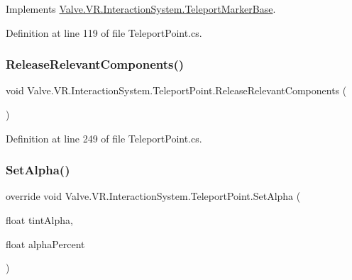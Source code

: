 Implements \mbox{\hyperlink{class_valve_1_1_v_r_1_1_interaction_system_1_1_teleport_marker_base_ab2505033275992613453b17981dd4053}{Valve.\+V\+R.\+Interaction\+System.\+Teleport\+Marker\+Base}}.



Definition at line 119 of file Teleport\+Point.\+cs.

\mbox{\label{class_valve_1_1_v_r_1_1_interaction_system_1_1_teleport_point_a018ebad25bd2d5b4196af3e490dfe868}} 
\subsubsection{\texorpdfstring{ReleaseRelevantComponents()}{ReleaseRelevantComponents()}}
{\footnotesize\ttfamily void Valve.\+V\+R.\+Interaction\+System.\+Teleport\+Point.\+Release\+Relevant\+Components (\begin{DoxyParamCaption}{ }\end{DoxyParamCaption})}



Definition at line 249 of file Teleport\+Point.\+cs.

\mbox{\label{class_valve_1_1_v_r_1_1_interaction_system_1_1_teleport_point_a3ed605b7757540a5b6225716c18ee090}} 
\subsubsection{\texorpdfstring{SetAlpha()}{SetAlpha()}}
{\footnotesize\ttfamily override void Valve.\+V\+R.\+Interaction\+System.\+Teleport\+Point.\+Set\+Alpha (\begin{DoxyParamCaption}\item[{float}]{tint\+Alpha,  }\item[{float}]{alpha\+Percent }\end{DoxyParamCaption})\hspace{0.3cm}{\ttfamily [virtual]}}



